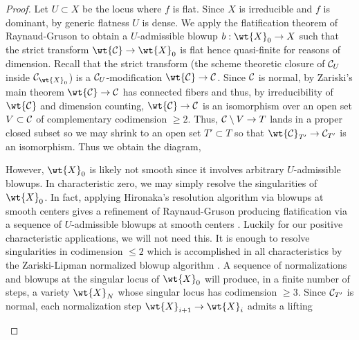 \documentclass[main.tex]{subfiles}
\begin{document}
\begin{proof}
Let $U \subset X$ be the locus where $f$ is flat. Since $X$ is irreducible and $f$ is dominant, by generic flatness $U$ is dense. We apply the flatification theorem of Raynaud-Gruson \cite[Theorem~5.2.2]{raynaud-gruson:flatification} to obtain a $U$-admissible blowup $b : \wt{X}_0 \to X$ such that the strict transform $\wt{\cC} \to \wt{X}_0$ is flat hence quasi-finite for reasons of dimension. Recall that the strict transform (the scheme theoretic closure of $\mathcal{C}_U$ inside $\cC_{\wt{X}_0}$) is a $\mathcal{C}_{U}$-modification $\wt{\cC} \to \cC$. Since $\mathcal{C}$ is normal, by Zariski's main theorem $\wt{\cC} \to \cC$ has connected fibers and thus, by irreducibility of $\wt{\cC}$ and dimension counting, $\wt{\cC} \to \cC$ is an isomorphism over an open set $V \subset \mathcal{C}$ of complementary codimension $\ge 2$. Thus, $\mathcal{C} \setminus V \to T$ lands in a proper closed subset so we may shrink to an open set $T' \subset T$ so that $\wt{\cC}_{T'} \to \cC_{T'}$ is an isomorphism. Thus we obtain the diagram, 
\begin{center}
\end{center}
However, $\wt{X}_0$ is likely not smooth since it involves arbitrary $U$-admissible blowups. In characteristic zero, we may simply resolve the singularities of $\wt{X}_0$. In fact, applying Hironaka's resolution algorithm via blowups at smooth centers gives a refinement of Raynaud-Gruson producing flatification via a sequence of $U$-admissible blowups at smooth centers \cite[Theorem~A]{rydh:functorial_flatification}. Luckily for our positive characteristic applications, we will not need this. It is enough to resolve singularities in codimension $\le 2$ which is accomplished in all characteristics by the Zariski-Lipman normalized blowup algorithm \cite{lipman:desingularization}. A sequence of normalizations and blowups at the singular locus of $\wt{X}_0$ will produce, in a finite number of steps, a variety $\wt{X}_N$ whose singular locus has codimension $\ge 3$. Since $\mathcal{C}_{T'}$ is normal, each normalization step $\wt{X}_{i+1} \to \wt{X}_i$ admits a lifting
\begin{center}
\end{center}
\end{proof}
\end{document}
